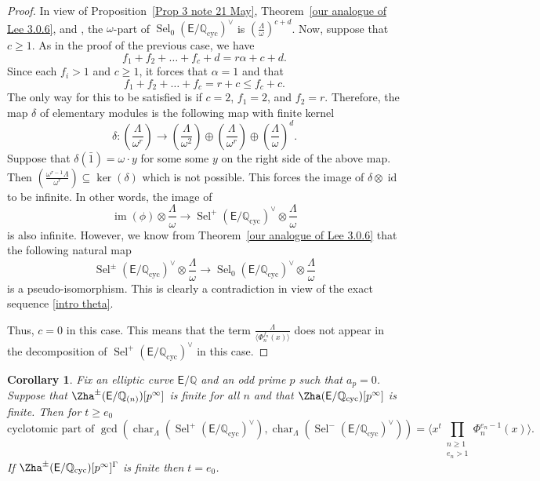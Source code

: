 \documentclass{amsart}
\newtheorem{corollary}[theorem]{Corollary}
\numberwithin{equation}{section}
\theoremstyle{remark}
\newcommand{\EC}{\mathsf{E}}
\newcommand{\Q}{\mathbb{Q}}
\newcommand{\cyc}{\operatorname{{cyc}}}
\newcommand{\image}{\operatorname{im}}
\newcommand{\Sel}{\operatorname{Sel}}
\newcommand{\charac}{\operatorname{char}}
\theoremstyle{plain} %
\begin{document}
\begin{proof}
In view of Proposition~\ref{Prop 3 note 21 May}, Theorem~\ref{our analogue of Lee 3.0.6}, and \cite[Theorem~C]{Lei23}, the $\omega$-part of $\Sel_{0}(\EC/\Q_{\cyc})^\vee$  is $\left(\frac{\Lambda}{\omega}\right)^{c+d}$.
Now, suppose that $c\geq 1$.
As in the proof of the previous case, we have
\[
f_1 + f_2 + \ldots + f_c + d = r\alpha + c + d.
\]
Since each $f_i > 1$ and $c\geq 1$, it forces that $\alpha =1$ and that
\[
f_1 + f_2 + \ldots + f_c = r + c \leq f_c + c.
\]
The only way for this to be satisfied is if $c=2$, $f_1 = 2$, and $f_2 =r$.
Therefore, the map $\delta$ of elementary modules is the following map with finite kernel
\[
\delta: \left(\frac{\Lambda}{\omega^r}\right) \longrightarrow \left(\frac{\Lambda}{\omega^2}\right) \oplus \left(\frac{\Lambda}{\omega^r}\right) \oplus \left(\frac{\Lambda}{\omega}\right)^d.
\]
Suppose that $\delta(\bar{1}) = \omega \cdot y$ for some some $y$ on the right side of the above map.
Then $\left( \frac{\omega^{r-1} \Lambda}{\omega^r} \right) \subseteq \ker(\delta)$ which is not possible.
This forces the image of $\delta \otimes \operatorname{id}$ to be infinite.
In other words, the image of
\[
\image(\phi) \otimes \frac{\Lambda}{\omega} \longrightarrow \Sel^+(\EC/\Q_{\cyc})^\vee \otimes \frac{\Lambda}{\omega}
\]
is also infinite.
However, we know from Theorem~\ref{our analogue of Lee 3.0.6} that the following natural map
\[
\Sel^{\pm}(\EC/\Q_{\cyc})^\vee \otimes \frac{\Lambda}{\omega} \longrightarrow \Sel_0(\EC/\Q_{\cyc})^\vee \otimes \frac{\Lambda}{\omega}
\]
is a pseudo-isomorphism.
This is clearly a contradiction in view of the exact sequence \eqref{intro theta}.

Thus, $c=0$ in this case.
This means that the term $\frac{\Lambda}{\langle \Phi^{f_n}_n(x) \rangle}$ does not appear in the decomposition of $\Sel^+(\EC/\Q_{\cyc})^\vee$ in this case.
\end{proof}

\begin{corollary}
Fix an elliptic curve $\EC/\Q$ and an odd prime $p$ such that $a_p =0$.
Suppose that $\Zha^{\pm}(\EC/\Q_{(n)})[p^{\infty}]$ is finite for all $n$ and that $\Zha(\EC/\Q_{\cyc})[p^\infty]$ is finite.
Then for $t\geq e_0$
\[
\text{cyclotomic part of } \gcd\left( \charac_{\Lambda}(\Sel^{+}(\EC/\Q_{\cyc})^\vee), \charac_{\Lambda}(\Sel^{-}(\EC/\Q_{\cyc})^\vee)\right) = \langle x^{t} \prod_{\substack{n\geq 1\\e_n>1}} \Phi^{e_n - 1}_n(x) \rangle.
\]
If $\Zha^{\pm}(\EC/\Q_{\cyc})[p^\infty]^{\Gamma}$ is finite then $t=e_0$.
\end{corollary}
\end{document}
